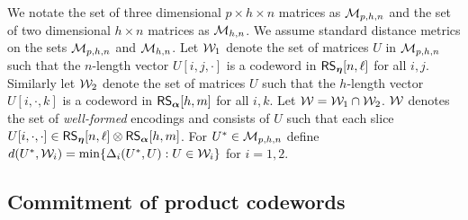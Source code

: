 We notate the set of three dimensional $p\times h\times n$ matrices as $\mathcal{M}_{p,h,n}$ and
the set of two dimensional $h\times n$ matrices as $\mathcal{M}_{h, n}$. We
assume standard distance metrics on the sets $\mathcal{M}_{p,h,n}$ and $\mathcal{M}_{h,n}$.
Let $\mathcal{W}_1$ denote the set of matrices
$U$ in $\mathcal{M}_{p,h,n}$ such that the $n$-length vector $U[i,j,\cdot]$ is a
codeword in $\mathsf{RS}_{\bm{\eta}}[n,\ell]$ for all $i,j$. Similarly let $\mathcal{W}_2$ denote the set of
matrices $U$ such that the $h$-length vector $U[i,\cdot,k]$ is a codeword in
$\mathsf{RS}_{\bm{\alpha}}[h,m]$ for all $i,k$.  Let $\mathcal{W}=\mathcal{W}_1\cap \mathcal{W}_2$. $\mathcal{W}$ denotes the set of {\em well-formed} encodings  and consists of $U$ such that each slice $U[i,\cdot,\cdot]\in \mathsf{RS}_{\bm{\eta}}[n,\ell]\otimes \mathsf{RS}_{\bm{\alpha}}[h,m]$. For $U^\ast\in \mathcal{M}_{p,h,n}$ define
$d(U^\ast,\mathcal{W}_i)=\min\{\Delta_i(U^\ast,U):U\in \mathcal{W}_i\}$ for $i=1,2$.

\begin{comment}
We now fix the notation for some of the codes that will be
frequently used throughout this section. We use $L_1$ and $L_2$ to denote codes
$\rsc{\eta}{n,\ell}$ and $\rsc{\alpha}{h,m}$ respectively. Let $\mc{C}_1 := \ric{L_1}{h}$ 
and $\mc{C}_2 :=\cic{L_2}{n}$ denote the interleaved codes of $L_1$ and $L_2$. In addition, 
we use codes $L_3 := \rsc{\eta}{n,s+\ell}$, $L_4 := \rsc{\eta}{n,2\ell}$ and 
$L_5=\rsc{\alpha}{h,2m}$ to encode some intermediate computations in our protocols.
Let $\Lambda_{n,\ell}$ denote the matrix for the linear transformation that maps a vector $x\in \FF^\ell$ 
to the unique codeword $y$ in $L_1$ such that $y_i=x_i$ for $i\in [\ell]$. Thus $\Lambda_{n,\ell}$ is 
an $n\times \ell$ matrix. Let $\Lambda_{h,m},\Lambda_{n,s+\ell},\Lambda_{n,2\ell}$ and $\Lambda_{h,2m}$ be similar matrices
for the codes $L_2,L_3,L_4$ and $L_5$ respectively. We denote the
parity check matrices for $L_i$  by $\mc{H}_i$ for $i\in \{1,\ldots,5\}$. 
We notate the set of three dimensional $p\times h\times n$ matrices as $\mc{M}_{p,h,n}$ and
the set of two dimensional $h\times n$ matrices as $\mc{M}_{h, n}$. We
assume standard distance metrics on the sets $\mc{M}_{p,h,n}$ and $\mc{M}_{h,n}$.
\end{comment}

\subsection{Commitment of product codewords}\label{sec:matrixcommitment}

